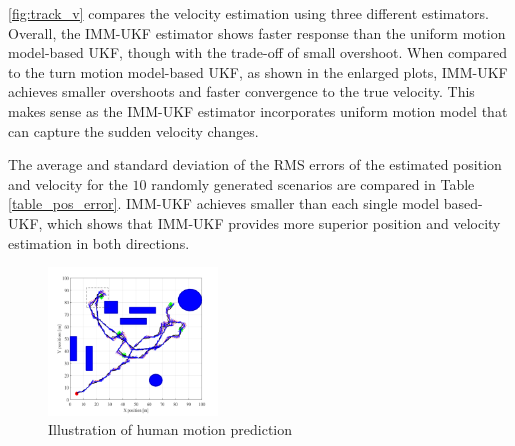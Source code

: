 \documentclass[journal]{IEEEtran}
\begin{document}
\cref{fig:track_v} compares the velocity estimation using three different estimators.
	Overall, the IMM-UKF estimator shows faster response than the uniform motion model-based UKF, though with the trade-off of small overshoot.
	When compared to the turn motion model-based UKF, as shown in the enlarged plots, IMM-UKF achieves smaller overshoots and faster convergence to the true velocity.
	This makes sense as the IMM-UKF estimator incorporates uniform motion model that can capture the sudden velocity changes.
    
The average and standard deviation of the RMS errors of the estimated position and velocity for the $10$ randomly generated scenarios are compared in Table \ref{table_pos_error}.
IMM-UKF achieves smaller than each single model based-UKF, which shows that IMM-UKF provides more superior position and velocity estimation in both directions.
   	\begin{figure}
		\centering
		\includegraphics[width=0.4\textwidth]{figures/Human_motion_prediction3}
        \caption{Illustration of human motion prediction}
		\label{fig:prediction}
	\end{figure}   

    
\end{document}

